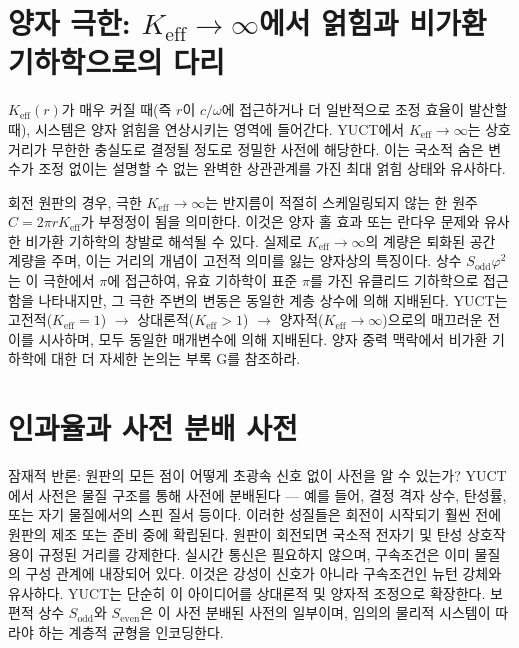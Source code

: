 \documentclass[12pt,a4paper]{article}
\newcommand{\Sodd}{S_{\mathrm{odd}}}
\newcommand{\Seven}{S_{\mathrm{even}}}
\begin{document}
	\section{양자 극한: \(K_{\mathrm{eff}} \to \infty\)에서 얽힘과 비가환 기하학으로의 다리}
	\label{sec:quantum-limit}
	
	\(K_{\mathrm{eff}}(r)\)가 매우 커질 때(즉 \(r\)이 \(c/\omega\)에 접근하거나 더 일반적으로 조정 효율이 발산할 때), 시스템은 양자 얽힘을 연상시키는 영역에 들어간다. YUCT에서 \(K_{\mathrm{eff}} \to \infty\)는 상호 거리가 무한한 충실도로 결정될 정도로 정밀한 사전에 해당한다. 이는 국소적 숨은 변수가 조정 없이는 설명할 수 없는 완벽한 상관관계를 가진 최대 얽힘 상태와 유사하다.
	
	회전 원판의 경우, 극한 \(K_{\mathrm{eff}} \to \infty\)는 반지름이 적절히 스케일링되지 않는 한 원주 \(C = 2\pi r K_{\mathrm{eff}}\)가 부정정이 됨을 의미한다. 이것은 양자 홀 효과 또는 란다우 문제와 유사한 비가환 기하학의 창발로 해석될 수 있다. 실제로 \(K_{\mathrm{eff}} \to \infty\)의 계량은 퇴화된 공간 계량을 주며, 이는 거리의 개념이 고전적 의미를 잃는 양자상의 특징이다. 상수 \(\Sodd \varphi^2\)는 이 극한에서 \(\pi\)에 접근하여, 유효 기하학이 표준 \(\pi\)를 가진 유클리드 기하학으로 접근함을 나타내지만, 그 극한 주변의 변동은 동일한 계층 상수에 의해 지배된다. YUCT는 고전적(\(K_{\mathrm{eff}}=1\)) \(\rightarrow\) 상대론적(\(K_{\mathrm{eff}}>1\)) \(\rightarrow\) 양자적(\(K_{\mathrm{eff}}\to\infty\))으로의 매끄러운 전이를 시사하며, 모두 동일한 매개변수에 의해 지배된다. 양자 중력 맥락에서 비가환 기하학에 대한 더 자세한 논의는 부록 G를 참조하라.
	
	\section{인과율과 사전 분배 사전}
	\label{sec:causality}
	
	잠재적 반론: 원판의 모든 점이 어떻게 초광속 신호 없이 사전을 알 수 있는가? YUCT에서 사전은 물질 구조를 통해 사전에 분배된다 — 예를 들어, 결정 격자 상수, 탄성률, 또는 자기 물질에서의 스핀 질서 등이다. 이러한 성질들은 회전이 시작되기 훨씬 전에 원판의 제조 또는 준비 중에 확립된다. 원판이 회전되면 국소적 전자기 및 탄성 상호작용이 규정된 거리를 강제한다. 실시간 통신은 필요하지 않으며, 구속조건은 이미 물질의 구성 관계에 내장되어 있다. 이것은 강성이 신호가 아니라 구속조건인 뉴턴 강체와 유사하다. YUCT는 단순히 이 아이디어를 상대론적 및 양자적 조정으로 확장한다. 보편적 상수 \(\Sodd\)와 \(\Seven\)은 이 사전 분배된 사전의 일부이며, 임의의 물리적 시스템이 따라야 하는 계층적 균형을 인코딩한다.
	
\end{document}

